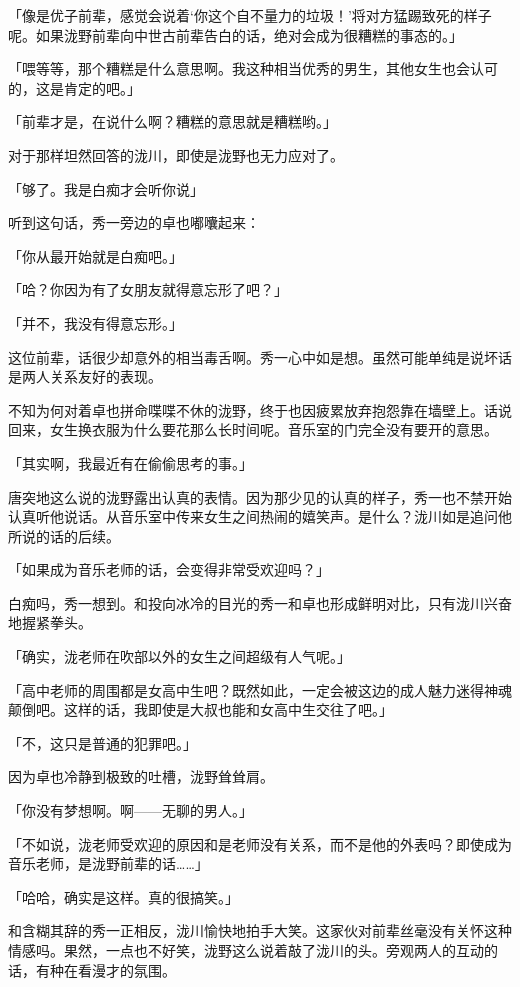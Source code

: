 \documentclass[UTF8]{ctexart}
\begin{document}
    「像是优子前辈，感觉会说着‘你这个自不量力的垃圾！’将对方猛踢致死的样子呢。如果泷野前辈向中世古前辈告白的话，绝对会成为很糟糕的事态的。」

    「喂等等，那个糟糕是什么意思啊。我这种相当优秀的男生，其他女生也会认可的，这是肯定的吧。」

    「前辈才是，在说什么啊？糟糕的意思就是糟糕哟。」

    对于那样坦然回答的泷川，即使是泷野也无力应对了。

    「够了。我是白痴才会听你说」

    听到这句话，秀一旁边的卓也嘟囔起来：

    「你从最开始就是白痴吧。」

    「哈？你因为有了女朋友就得意忘形了吧？」

    「并不，我没有得意忘形。」

    这位前辈，话很少却意外的相当毒舌啊。秀一心中如是想。虽然可能单纯是说坏话是两人关系友好的表现。

    不知为何对着卓也拼命喋喋不休的泷野，终于也因疲累放弃抱怨靠在墙壁上。话说回来，女生换衣服为什么要花那么长时间呢。音乐室的门完全没有要开的意思。

    「其实啊，我最近有在偷偷思考的事。」

    唐突地这么说的泷野露出认真的表情。因为那少见的认真的样子，秀一也不禁开始认真听他说话。从音乐室中传来女生之间热闹的嬉笑声。是什么？泷川如是追问他所说的话的后续。

    「如果成为音乐老师的话，会变得非常受欢迎吗？」

    白痴吗，秀一想到。和投向冰冷的目光的秀一和卓也形成鲜明对比，只有泷川兴奋地握紧拳头。

    「确实，泷老师在吹部以外的女生之间超级有人气呢。」

    「高中老师的周围都是女高中生吧？既然如此，一定会被这边的成人魅力迷得神魂颠倒吧。这样的话，我即使是大叔也能和女高中生交往了吧。」

    「不，这只是普通的犯罪吧。」

    因为卓也冷静到极致的吐槽，泷野耸耸肩。

    「你没有梦想啊。啊——无聊的男人。」

    「不如说，泷老师受欢迎的原因和是老师没有关系，而不是他的外表吗？即使成为音乐老师，是泷野前辈的话……」

    「哈哈，确实是这样。真的很搞笑。」

    和含糊其辞的秀一正相反，泷川愉快地拍手大笑。这家伙对前辈丝毫没有关怀这种情感吗。果然，一点也不好笑，泷野这么说着敲了泷川的头。旁观两人的互动的话，有种在看漫才的氛围。
\end{document}
